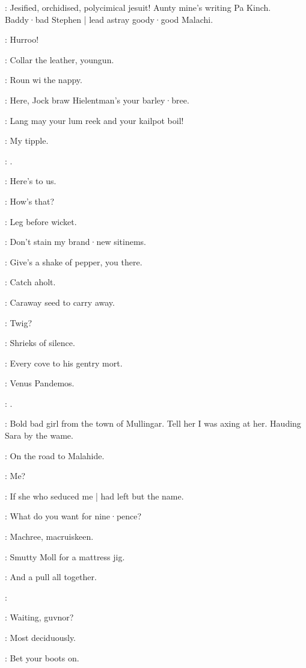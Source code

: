 \mulligan:
Jesified,
orchidised,
polycimical jesuit!
Aunty mine's writing Pa Kinch.
Baddy·bad Stephen |
lead astray goody·good Malachi.


\lenehan:
Hurroo!

\punch:
Collar the leather,
youngun.

\dixon:
Roun wi the nappy.

\lenehan:
Here,
Jock braw Hielentman's your barley·bree.

\crotthers:
Lang may your lum reek and your kailpot boil!

\stephen:
My tipple.

\mulligan:
.

\dixon:
Here's to us.

\madden:
How's that?

\lynch:
Leg before wicket.

\mulligan:
Don't stain my brand·new sitinems.

\crotthers:
Give's a shake of pepper,
you there.

\lenehan:
Catch aholt.

\Bloom:
Caraway seed to carry away.

\bannon:
Twig?

:
Shrieks of silence.

:
Every cove to his gentry mort.

\stephen:
Venus Pandemos.

\lynch:
.

\bannon:
Bold bad girl from the town of Mullingar.
Tell her I was axing at her.
Hauding Sara by the wame.

\lynch:
On the road to Malahide.

\crotthers:
Me?

\punch:
If she who seduced me |
had left but the name.

\lenehan:
What do you want for nine·pence?

\stephen:
Machree,
macruiskeen.

\lynch:
Smutty Moll for a mattress jig.

\punch:
And a pull all together.

\All:


\bystander:
Waiting,
guvnor?

\lenehan:
Most deciduously.

\lynch:
Bet your boots on.

